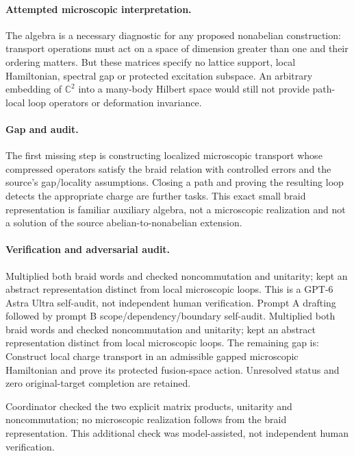 \documentclass[11pt]{article}
\begin{document}
\paragraph{Attempted microscopic interpretation.} The algebra is a necessary diagnostic for any proposed nonabelian construction: transport operations must act on a space of dimension greater than one and their ordering matters. But these matrices specify no lattice support, local Hamiltonian, spectral gap or protected excitation subspace. An arbitrary embedding of \(\mathbb C^2\) into a many-body Hilbert space would still not provide path-local loop operators or deformation invariance.
\paragraph{Gap and audit.} The first missing step is constructing localized microscopic transport whose compressed operators satisfy the braid relation with controlled errors and the source's gap/locality assumptions. Closing a path and proving the resulting loop detects the appropriate charge are further tasks. This exact small braid representation is familiar auxiliary algebra, not a microscopic realization and not a solution of the source abelian-to-nonabelian extension.

\paragraph{Verification and adversarial audit.}
Multiplied both braid words and checked noncommutation and unitarity; kept an abstract representation distinct from local microscopic loops. This is a GPT-6 Astra Ultra self-audit, not independent human verification. Prompt A drafting followed by prompt B scope/dependency/boundary self-audit. Multiplied both braid words and checked noncommutation and unitarity; kept an abstract representation distinct from local microscopic loops. The remaining gap is: Construct local charge transport in an admissible gapped microscopic Hamiltonian and prove its protected fusion-space action. Unresolved status and zero original-target completion are retained.

Coordinator checked the two explicit matrix products, unitarity and noncommutation; no microscopic realization follows from the braid representation. This additional check was model-assisted, not independent human verification.
\end{document}
